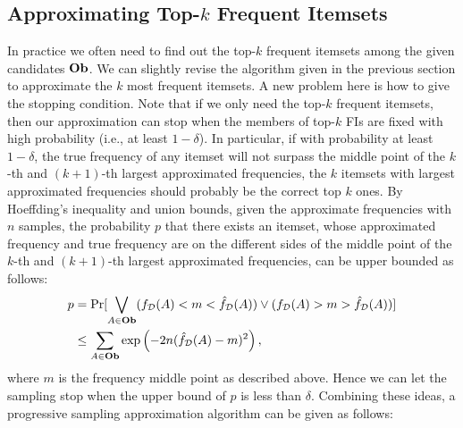 \documentclass{article}
\begin{document}
\subsection{Approximating Top-$k$ Frequent Itemsets}
\label{sec:prg}
In practice we often need to find out the top-$k$ frequent itemsets among the given candidates $\mathbf{Ob}$. We can slightly revise the algorithm given in the previous section to approximate the $k$ most frequent itemsets. A new problem here is how to give the stopping condition. Note that if we only need the top-$k$ frequent itemsets, then our approximation can stop when the members of top-$k$ FIs are fixed with high probability (i.e., at least $1-\delta$). In particular, if with probability at least $1-\delta$, the true frequency of any itemset will not surpass the middle point of the $k$-th and $(k+1)$-th largest approximated frequencies, the $k$ itemsets with largest approximated frequencies should probably be the correct top $k$ ones. By Hoeffding's inequality and union bounds, given the approximate frequencies with $n$ samples, the probability $p$ that there exists an itemset, whose approximated frequency and true frequency are on the different sides of the middle point of the $k$-th and $(k+1)$-th largest approximated frequencies, can be upper bounded as follows: 
$$\begin{aligned}
p&=\Pr[\bigvee_{A\in\mathbf{Ob}} (f_{\mathcal{D}}(A) < m < \hat{f}_{\mathcal{D}}(A)) \vee (f_{\mathcal{D}}(A) > m > \hat{f}_{\mathcal{D}}(A)) ] \\
&\leq \sum_{A\in\mathbf{Ob}} \exp\left(-2n(\hat{f}_{\mathcal{D}}(A) - m)^2\right),
\end{aligned}$$
where $m$ is the frequency middle point as described above. 
Hence we can let the sampling stop when the upper bound of $p$ is less than $\delta$. 
Combining these ideas, a progressive sampling approximation algorithm can be given as follows:
\end{document}
